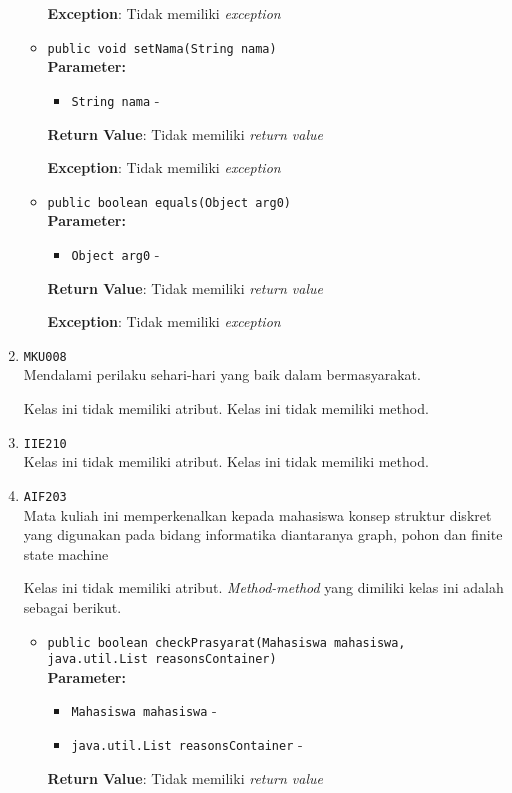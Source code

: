\documentclass{article}
\begin{document}
\begin{enumerate}
\begin{itemize}
\textbf{Exception}: Tidak memiliki \textit{exception}

\item \texttt{public void setNama(String nama)}\\ 


\textbf{Parameter:}\begin{itemize}
\item \texttt{String nama} - 
\end{itemize}
\textbf{Return Value}: Tidak memiliki \textit{return value}

\textbf{Exception}: Tidak memiliki \textit{exception}

\item \texttt{public boolean equals(Object arg0)}\\ 


\textbf{Parameter:}\begin{itemize}
\item \texttt{Object arg0} - 
\end{itemize}
\textbf{Return Value}: Tidak memiliki \textit{return value}

\textbf{Exception}: Tidak memiliki \textit{exception}

\end{itemize}
\item \texttt{MKU008}\\ 
Mendalami perilaku sehari-hari yang baik dalam bermasyarakat.

Kelas ini tidak memiliki atribut. Kelas ini tidak memiliki method. \item \texttt{IIE210}\\ 


Kelas ini tidak memiliki atribut. Kelas ini tidak memiliki method. \item \texttt{AIF203}\\ 
Mata kuliah ini memperkenalkan kepada mahasiswa konsep struktur diskret yang 
 digunakan pada bidang informatika diantaranya graph, pohon dan finite state 
 machine

Kelas ini tidak memiliki atribut. \textit{Method-method} yang dimiliki kelas ini adalah sebagai berikut.
\begin{itemize}
\item \texttt{public boolean checkPrasyarat(Mahasiswa mahasiswa, java.util.List reasonsContainer)}\\ 


\textbf{Parameter:}\begin{itemize}
\item \texttt{Mahasiswa mahasiswa} - 
\item \texttt{java.util.List reasonsContainer} - 
\end{itemize}
\textbf{Return Value}: Tidak memiliki \textit{return value}


\end{itemize}
\end{enumerate}
\end{document}
